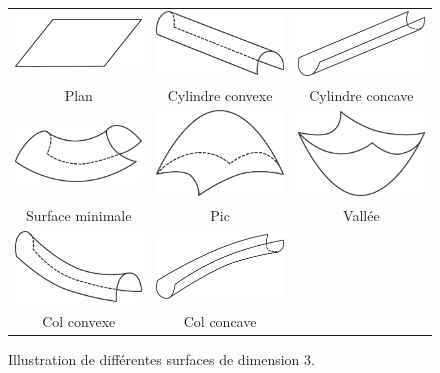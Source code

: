 \begin{figure}[ht]
  \begin{center}
    \setlength{\tabcolsep}{0.5cm}
    \begin{tabular}{ccc}
      \includegraphics[width=3.5cm]{figures/curv_plan} &
      \includegraphics[width=3.5cm]{figures/curv_cylindre_conv} &
      \includegraphics[width=3.5cm]{figures/curv_cylindre_conc}
      \\
      Plan &
      Cylindre convexe &
      Cylindre concave
      \\
      \includegraphics[width=3.5cm]{figures/curv_minimal} &
      \includegraphics[width=3.5cm]{figures/curv_pic} &
      \includegraphics[width=3.5cm]{figures/curv_vallee}
      \\
      Surface minimale &
      Pic &
      Vallée
      \\
      \includegraphics[width=3.5cm]{figures/curv_col_conv} &
      \includegraphics[width=3.5cm]{figures/curv_col_conc} &
      \\
      Col convexe &
      Col concave &
    \end{tabular}
    \caption{Illustration de différentes surfaces de dimension 3.\label{fig:curvature-figures}}
  \end{center}
\end{figure}
